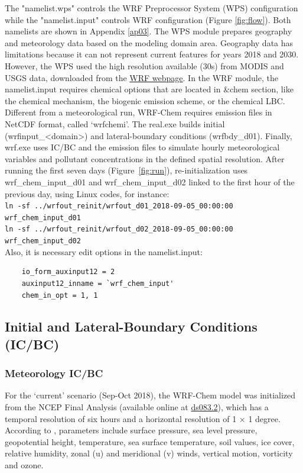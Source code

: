 The "namelist.wps" controls the WRF Preprocessor System (WPS) configuration while the "namelist.input" controls WRF configuration (Figure \ref{fig:flow}).
Both namelists are shown in Appendix \ref{ap03}.
The WPS module prepares geography and meteorology data based on the modeling domain area.
Geography data has limitations because it can not represent current features for years 2018 and 2030.
However, the WPS used the high resolution available (30s) from MODIS and USGS data, downloaded from the \href{https://www2.mmm.ucar.edu/wrf/users/download/get_sources_wps_geog.html}{WRF webpage}.
In the WRF module, the namelist.input requires chemical options that are located in \&chem section, like the chemical mechanism, the biogenic emission scheme, or the chemical LBC. 
Different from a meteorological run, WRF-Chem requires emission files in NetCDF format, called `wrfchemi'.
The real.exe builds initial (wrfinput\_<domain>) and lateral-boundary conditions (wrfbdy\_d01).
Finally, wrf.exe uses IC/BC and the emission files to simulate hourly meteorological variables and pollutant concentrations in the defined spatial resolution.
 After running the first seven days (Figure~\ref{fig:run}), re-initialization uses wrf\_chem\_input\_d01 and wrf\_chem\_input\_d02 linked to the first hour of the previous day, using Linux codes, for instance:
  \\ \verb|ln -sf ../wrfout_reinit/wrfout_d01_2018-09-05_00:00:00 wrf_chem_input_d01|\\
  \verb|ln -sf ../wrfout_reinit/wrfout_d02_2018-09-05_00:00:00 wrf_chem_input_d02|\\
 Also, it is necessary edit options in the namelist.input:
 \begin{verbatim}
 	io_form_auxinput12 = 2
 	auxinput12_inname = `wrf_chem_input'
 	chem_in_opt = 1, 1
 \end{verbatim}
	
	
	\subsection{Initial and Lateral-Boundary Conditions (IC/BC)}
	
		\subsubsection{Meteorology IC/BC}
		For the `current' scenario (Sep-Oct 2018), the WRF-Chem model was initialized from the NCEP Final Analysis (available online at \href{https://rda.ucar.edu/datasets/ds083.2/}{ds083.2}), which has a temporal resolution of six hours and a horizontal resolution of 1 $\times$ 1 degree.
		According to \cite{NCEP2000}, parameters include surface pressure, sea level pressure, geopotential height, temperature, sea surface temperature, soil values, ice cover, relative humidity, zonal (u) and meridional (v) winds, vertical motion, vorticity and ozone.
		
